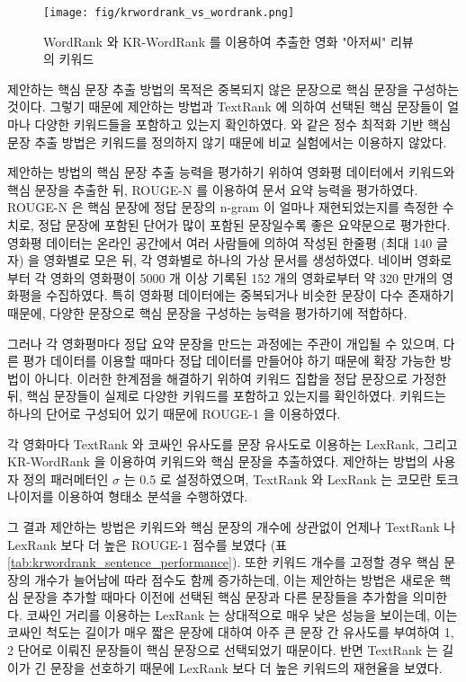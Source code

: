 \documentclass[oneside, ko,phd]{snuthesis_utf8_kor}
\begin{document}
\begin{figure}[H]
\centering
\texttt{[image: fig/krwordrank\_vs\_wordrank.png]}
\caption{WordRank 와 KR-WordRank 를 이용하여 추출한 영화 "아저씨" 리뷰의 키워드}
\label{fig:krwordrank_vs_wordrank}
\end{figure}

제안하는 핵심 문장 추출 방법의 목적은 중복되지 않은 문장으로 핵심 문장을 구성하는 것이다.
그렇기 때문에 제안하는 방법과 TextRank 에 의하여 선택된 핵심 문장들이 얼마나 다양한 키워드들을 포함하고 있는지 확인하였다.
\cite{mcdonald2007study, parveen2015topical} 와 같은 정수 최적화 기반 핵심 문장 추출 방법은 키워드를 정의하지 않기 때문에 비교 실험에서는 이용하지 않았다.

제안하는 방법의 핵심 문장 추출 능력을 평가하기 위하여 영화평 데이터에서 키워드와 핵심 문장을 추출한 뒤, ROUGE-N \cite{lin2004rouge} 를 이용하여 문서 요약 능력을 평가하였다.
ROUGE-N 은 핵심 문장에 정답 문장의 n-gram 이 얼마나 재현되었는지를 측정한 수치로, 정답 문장에 포함된 단어가 많이 포함된 문장일수록 좋은 요약문으로 평가한다.
영화평 데이터는 온라인 공간에서 여러 사람들에 의하여 작성된 한줄평 (최대 140 글자) 을 영화별로 모은 뒤, 각 영화별로 하나의 가상 문서를 생성하였다.
네이버 영화로부터 각 영화의 영화평이 5000 개 이상 기록된 152 개의 영화로부터 약 320 만개의 영화평을 수집하였다.
특히 영화평 데이터에는 중복되거나 비슷한 문장이 다수 존재하기 때문에, 다양한 문장으로 핵심 문장을 구성하는 능력을 평가하기에 적합하다.

그러나 각 영화평마다 정답 요약 문장을 만드는 과정에는 주관이 개입될 수 있으며, 다른 평가 데이터를 이용할 때마다 정답 데이터를 만들어야 하기 때문에 확장 가능한 방법이 아니다.
이러한 한계점을 해결하기 위하여 키워드 집합을 정답 문장으로 가정한 뒤, 핵심 문장들이 실제로 다양한 키워드를 포함하고 있는지를 확인하였다.
키워드는 하나의 단어로 구성되어 있기 때문에 ROUGE-1 을 이용하였다.

각 영화마다 TextRank 와 코싸인 유사도를 문장 유사도로 이용하는 LexRank, 그리고 KR-WordRank 을 이용하여 키워드와 핵심 문장을 추출하였다.
제안하는 방법의 사용자 정의 패러메터인 $\sigma$ 는 0.5 로 설정하였으며, TextRank 와 LexRank 는 코모란 토크나이저를 이용하여 형태소 분석을 수행하였다.

그 결과 제안하는 방법은 키워드와 핵심 문장의 개수에 상관없이 언제나 TextRank 나 LexRank 보다 더 높은 ROUGE-1 점수를 보였다 (표 \ref{tab:krwordrank_sentence_performance}).
또한 키워드 개수를 고정할 경우 핵심 문장의 개수가 늘어남에 따라 점수도 함께 증가하는데, 이는 제안하는 방법은 새로운 핵심 문장을 추가할 때마다 이전에 선택된 핵심 문장과 다른 문장들을 추가함을 의미한다.
코싸인 거리를 이용하는 LexRank 는 상대적으로 매우 낮은 성능을 보이는데, 이는 코싸인 척도는 길이가 매우 짧은 문장에 대하여 아주 큰 문장 간 유사도를 부여하여 1, 2 단어로 이뤄진 문장들이 핵심 문장으로 선택되었기 때문이다.
반면 TextRank 는 길이가 긴 문장을 선호하기 때문에 LexRank 보다 더 높은 키워드의 재현율을 보였다.
\end{document}
